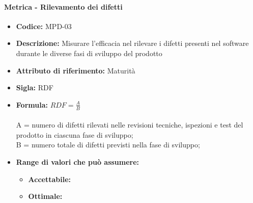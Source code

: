                 \paragraph{Metrica - Rilevamento dei difetti} 
                  \begin{itemize}
         \item   \textbf{Codice:} MPD-03
         \item   \textbf{Descrizione:} Misurare l'efficacia nel rilevare i difetti presenti nel software durante le diverse fasi di sviluppo del prodotto
        \item    \textbf{Attributo di riferimento:} Maturità
        \item    \textbf{Sigla:} RDF
        \item    \textbf{Formula:} \begin{math} RDF = \frac{A}{B}\end{math}\\ \\
             A = numero di difetti rilevati nelle revisioni tecniche, ispezioni e test del prodotto in ciascuna fase di sviluppo;\\
              B = numero totale di difetti previsti nella fase di sviluppo;
             \item \textbf{Range di valori che può assumere:}
        \begin{itemize}
            \item \textbf{Accettabile:} 
            \item \textbf{Ottimale:} 
        \end{itemize}
       \end{itemize}
              
                  

